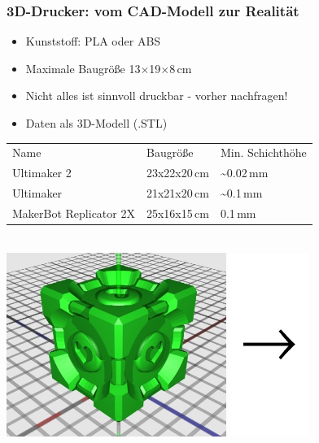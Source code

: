 \documentclass[t]{beamer}
\begin{document}
\begin{frame}
    \frametitle{3D-Drucker: vom CAD-Modell zur Realität}
    \begin{itemize}
        \item Kunststoff: PLA oder ABS
        \item Maximale Baugröße 13$\times$19$\times$8\,cm
        \item Nicht alles ist sinnvoll druckbar - vorher nachfragen!
        \item Daten als 3D-Modell (.STL)
    \end{itemize}
    \bigskip
    \begin{tabular}{lll}
        {\color{faublue} Name} & {\color{faublue} Baugröße} & {\color{faublue} Min. Schichthöhe}\\
        Ultimaker 2 & 23x22x20\,cm & \textasciitilde0.02\,mm \\
        Ultimaker & 21x21x20\,cm & \textasciitilde0.1\,mm \\
        MakerBot Replicator 2X & 25x16x15\,cm & 0.1\,mm \\
    \end{tabular}
    \bigskip
    \begin{center}
    ~\\
        \includegraphics[height=6cm]{../img/companioncube_render.png}
        \includegraphics[height=6cm]{../img/pfeil.pdf}

\end{center}
\end{frame}
\end{document}

